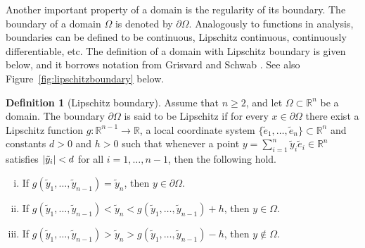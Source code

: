 \documentclass[english, 12pt, a4paper, sci, utf8, a-2b, online]{aaltothesis}
\theoremstyle{definition}
\newtheorem{definition}{Definition}[section]
\theoremstyle{plain}
\DeclarePairedDelimiter\abs{\lvert}{\rvert}
\numberwithin{equation}{section}
\begin{document}
Another important property of a domain is the regularity of its boundary.
The boundary of a domain $\Omega$ is denoted by $\partial \Omega$.
Analogously to functions in analysis, boundaries can be defined to be continuous,
Lipschitz continuous, continuously differentiable, etc.
The definition of a domain with Lipschitz boundary is given below,
and it borrows notation from
Grisvard \cite{grisvard2011} and Schwab \cite{schwab1998}.
See also Figure~\ref{fig:lipschitzboundary} below.
\begin{definition}[Lipschitz boundary]
    \label{def:lipschitzboundary}
    Assume that $n \geq 2$, and let $\Omega \subset \mathbb{R}^n$ be a domain.
    The boundary $\partial \Omega$ is said to be Lipschitz
    if for every $x \in \partial \Omega$ there exist a Lipschitz function
    $g: \mathbb{R}^{n-1} \to \mathbb{R}$, a local coordinate
    system $\{\tilde{e}_1,\dotsc,\tilde{e}_n\} \subset \mathbb{R}^n$
    and constants $d > 0$ and $h > 0$ such that whenever
    a point $y = \sum_{i=1}^{n} \tilde{y}_i \tilde{e}_i \in \mathbb{R}^n$
    satisfies $\abs{\tilde{y}_i} < d$ for all $i=1,\dotsc,n-1$,
    then the following hold.
    \begin{enumerate}[(i)]
        \item \label{def:lipschitzboundary_cond1}
        If $g(\tilde{y}_1,\dotsc,\tilde{y}_{n-1}) = \tilde{y}_n$,
        then $y \in \partial \Omega$.
        \item \label{def:lipschitzboundary_cond2}
        If $g(\tilde{y}_1,\dotsc,\tilde{y}_{n-1}) < \tilde{y}_n
        < g(\tilde{y}_1,\dotsc,\tilde{y}_{n-1}) + h$, then $y \in \Omega$.
        \item \label{def:lipschitzboundary_cond3}
        If $g(\tilde{y}_1,\dotsc,\tilde{y}_{n-1}) > \tilde{y}_n
        > g(\tilde{y}_1,\dotsc,\tilde{y}_{n-1}) - h$, then $y \notin \Omega$.
    \end{enumerate}
\end{definition}
\end{document}
